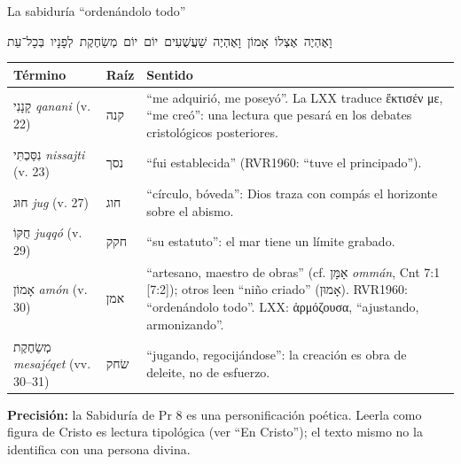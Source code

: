 \documentclass[hyperref={bookmarks=false},aspectratio=169]{beamer}
\newcommand{\heb}[1]{\mbox{\foreignlanguage{hebrew}{#1}}}
\newcommand{\grc}[1]{\foreignlanguage{ancientgreek}{#1}}
\newcommand{\precision}[1]{{\footnotesize\color{gris}\textbf{Precisión:} #1}}
\begin{document}
\begin{frame}{La sabiduría ``ordenándolo todo''}
\begin{center}\small\heb{וָאֶהְיֶה אֶצְלוֹ אָמוֹן וָאֶהְיֶה שַׁעֲשֻׁעִים יוֹם יוֹם}\ \heb{מְשַׂחֶקֶת לְפָנָיו בְּכָל־עֵת}\end{center}
\scriptsize\renewcommand{\arraystretch}{1.15}
\begin{tabular}{@{}>{\RaggedRight\arraybackslash}p{2.6cm}>{\RaggedRight\arraybackslash}p{1.1cm}>{\RaggedRight\arraybackslash}p{8.1cm}@{}}
\toprule
\textbf{Término} & \textbf{Raíz} & \textbf{Sentido} \\ \midrule
\heb{קָנָנִי} \emph{qanani} (v. 22) & \heb{קנה} & ``me adquirió, me poseyó''. La LXX traduce \grc{ἔκτισέν με}, ``me creó'': una lectura que pesará en los debates cristológicos posteriores. \\
\heb{נִסַּכְתִּי} \emph{nissajti} (v. 23) & \heb{נסך} & ``fui establecida'' (RVR1960: ``tuve el principado''). \\
\heb{חוּג} \emph{jug} (v. 27) & \heb{חוג} & ``círculo, bóveda'': Dios traza con compás el horizonte sobre el abismo. \\
\heb{חֻקּוֹ} \emph{juqqó} (v. 29) & \heb{חקק} & ``su estatuto'': el mar tiene un límite grabado. \\
\heb{אָמוֹן} \emph{amón} (v. 30) & \heb{אמן} & ``artesano, maestro de obras'' (cf. \heb{אָמָּן} \emph{ommán}, Cnt 7:1 [7:2]); otros leen ``niño criado'' (\heb{אָמוּן}). RVR1960: ``ordenándolo todo''. LXX: \grc{ἁρμόζουσα}, ``ajustando, armonizando''. \\
\heb{מְשַׂחֶקֶת} \emph{mesajéqet} (vv. 30--31) & \heb{שׂחק} & ``jugando, regocijándose'': la creación es obra de deleite, no de esfuerzo. \\
\bottomrule
\end{tabular}\par\smallskip
\precision{la Sabiduría de Pr 8 es una personificación poética. Leerla como figura de Cristo es lectura tipológica (ver ``En Cristo''); el texto mismo no la identifica con una persona divina.}
\end{frame}
\end{document}
